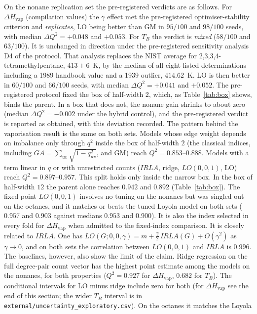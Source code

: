 \documentclass[a5paper, 10pt]{article}
\theoremstyle{plain}
\theoremstyle{remark}
\theoremstyle{definition}
\begin{document}
On the nonane replication set the pre-registered verdicts are as
follows. For $\Delta H_{\mathrm{vap}}$ (compilation values) the $\gamma$
effect met the pre-registered optimiser-stability criterion and
\emph{replicates}, LO being better than GM in $95/100$ and $98/100$
seeds, with median $\Delta Q^2 = +0.048$ and $+0.053$. For $T_B$ the
verdict is \emph{mixed} ($58/100$ and $63/100$). It is unchanged in
direction under the pre-registered sensitivity analysis D4 of the
protocol. That analysis replaces the NIST average for
2,3,3,4-tetramethylpentane, $413 \pm 6$~K, by the median of all eight
listed determinations including a 1989 handbook value and a 1939
outlier, $414.62$~K. LO is then better in $60/100$ and $66/100$ seeds,
with median $\Delta Q^2 = +0.041$ and $+0.052$. The pre-registered
protocol fixed the box of half-width $2$, which, as
Table~\ref{tab:box} shows, binds the parent. In a box that does not, the nonane gain
shrinks to about zero (median $\Delta Q^2 = -0.002$ under the hybrid control), and
the pre-registered verdict is reported as obtained, with this deviation
recorded. The pattern behind the vaporisation result is the same on
both sets. Models whose edge weight depends on imbalance only through
$q^2$ inside the box of half-width $2$ (the classical indices,
including $GA = \sum_{uv}\sqrt{1-q_{uv}^2}$, and GM) reach
$Q^2 = 0.853$--$0.888$. Models with a term linear in $q$ or with
unrestricted counts ($IRLA$, ridge, $LO(0,0,1)$, LO) reach
$Q^2 = 0.897$--$0.957$. This split holds only inside the narrow box. In
the box of half-width $12$ the parent alone reaches $0.942$ and $0.892$
(Table~\ref{tab:box}). The fixed point $LO(0,0,1)$ involves no tuning on the nonanes but was singled out on the octanes, and it matches or beats the tuned Loyola model on both
sets ($0.957$ and $0.903$ against medians $0.953$ and $0.900$). It is
also the index selected in every fold for $\Delta H_{\mathrm{vap}}$
when admitted to the fixed-index comparison. It is closely related to
$IRLA$. One has
$LO(G;0,0,\gamma) = m + \tfrac{\gamma}{2}\,IRLA(G) + O(\gamma^2)$ as
$\gamma \to 0$, and on both sets the correlation between $LO(0,0,1)$
and $IRLA$ is $0.996$. The baselines, however, also show the limit of
the claim. Ridge regression on the full degree-pair count vector has the
highest point estimate among the models on the nonanes, for both
properties ($Q^2 = 0.927$ for $\Delta H_{\mathrm{vap}}$, $0.682$ for
$T_B$). The conditional intervals for LO minus ridge include zero for
both (for $\Delta H_{\mathrm{vap}}$ see the end of this section; the wider
$T_B$ interval is in \texttt{external/uncertainty\_exploratory.csv}). On the octanes it matches the Loyola
\end{document}
